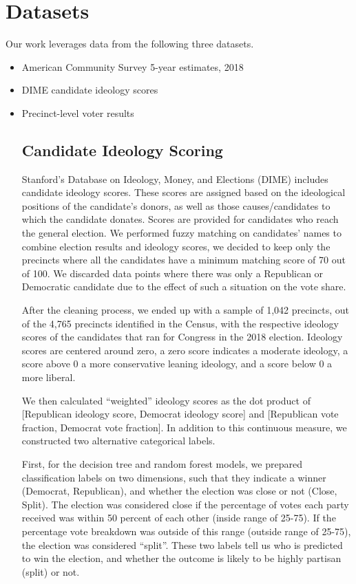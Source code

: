 \documentclass{article}
\begin{document}
\section{Datasets}


Our work leverages data from the following three datasets. 
\begin{itemize}
    \item American Community Survey 5-year estimates, 2018
    \item DIME candidate ideology scores
    \item Precinct-level voter results

\subsection{Candidate Ideology Scoring}


Stanford’s Database on Ideology, Money, and Elections (DIME) includes candidate ideology scores. These scores are assigned based on the ideological positions of the candidate’s donors, as well as those causes/candidates to which the candidate donates. Scores are provided for candidates who reach the general election. We performed fuzzy matching on candidates’ names to combine election results and ideology scores, we decided to keep only the precincts where all the candidates have a minimum matching score of 70 out of 100. We discarded data points where there was only a Republican or Democratic candidate due to the effect of such a situation on the vote share. 

After the cleaning process, we ended up with a sample of 1,042 precincts, out of the 4,765 precincts identified in the Census, with the respective ideology scores of the candidates that ran for Congress in the 2018 election. Ideology scores are centered around zero, a zero score indicates a moderate ideology, a score above 0 a more conservative leaning ideology, and a score below 0 a more liberal. 

We then calculated “weighted” ideology scores as the dot product of [Republican ideology score, Democrat ideology score] and [Republican vote fraction, Democrat vote fraction]. In addition to this continuous measure, we constructed two alternative categorical labels.

First, for the decision tree and random forest models, we prepared classification labels on two dimensions, such that they indicate a winner (Democrat, Republican), and whether the election was close or not (Close, Split). The election was considered close if the percentage of votes each party received was within 50 percent of each other (inside range of 25-75). If the percentage vote breakdown was outside of this range (outside range of 25-75), the election was considered “split”. These two labels tell us who is predicted to win the election, and whether the outcome is likely to be highly partisan (split) or not.


\end{itemize}
\end{document}
